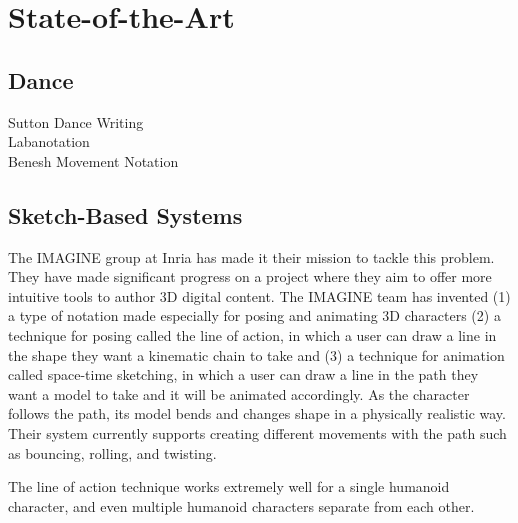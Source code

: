 \chapter{State-of-the-Art}\label{chap:sota}



\section{Dance}
Sutton Dance Writing\\
Labanotation\\
Benesh Movement Notation

\section{Sketch-Based Systems}
The IMAGINE group at Inria has made it their mission to tackle this problem. They have made significant progress on a project where they aim to offer more intuitive tools to author 3D digital content. The IMAGINE team has invented (1) a type of notation made especially for posing and animating 3D characters (2) a technique for posing called the line of action, in which a user can draw a line in the shape they want a kinematic chain to take and (3) a technique for animation called space-time sketching, in which a user can draw a line in the path they want a model to take and it will be animated accordingly. As the character follows the path, its model bends and changes shape in a physically realistic way. Their system currently supports creating different movements with the path such as bouncing, rolling, and twisting.

The line of action technique works extremely well for a single humanoid character, and even multiple humanoid characters separate from each other. 


